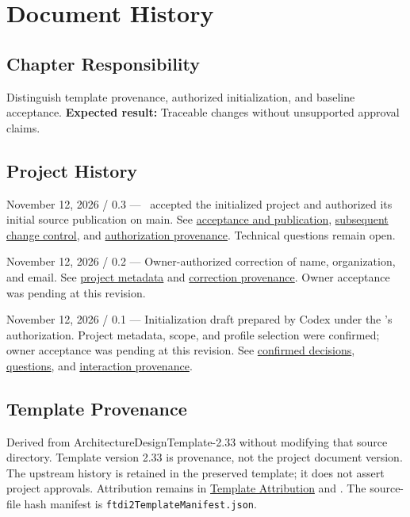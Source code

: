 \chapter{Document History}
\section{Chapter Responsibility}
\label{Section:DocumentHistoryResponsibility}
Distinguish template provenance, authorized initialization, and baseline acceptance.
\noindent\textbf{Expected result:} Traceable changes without unsupported approval claims.
\section{Project History}
\label{Table:DocumentHistory}
November 12, 2026 / 0.3 --- \DocumentOwner\ accepted the initialized project
and authorized its initial source publication on main. See
\hyperref[Section:InitializationPublication]{acceptance and publication},
\hyperref[Section:ProjectChangeControl]{subsequent change control}, and
\hyperref[Section:PublicationAuthorization]{authorization provenance}.
Technical questions remain open.


November 12, 2026 / 0.2 --- Owner-authorized correction of name, organization,
and email. See \hyperref[Section:ConfirmedProjectDecisions]{project metadata}
and \hyperref[Section:OwnerIdentityCorrection]{correction provenance}.
Owner acceptance was pending at this revision.


November 12, 2026 / 0.1 --- Initialization draft prepared by Codex under the
\DocumentOwner's authorization. Project metadata, scope, and profile selection
were confirmed; owner acceptance was pending at this revision.
See \hyperref[Section:ConfirmedProjectDecisions]{confirmed decisions},
\hyperref[Section:OwnedQuestions]{questions}, and
\hyperref[Section:InitializationInteraction]{interaction provenance}.
\section{Template Provenance}
Derived from ArchitectureDesignTemplate-2.33 without modifying that source
directory. Template version 2.33 is provenance, not the project document version.
The upstream history is retained in the preserved template; it does not assert
project approvals. Attribution remains in
\hyperref[Chapter:TemplateAttribution]{Template Attribution} and
. The source-file hash manifest is
\texttt{ftdi2TemplateManifest.json}.

\glsaddall
